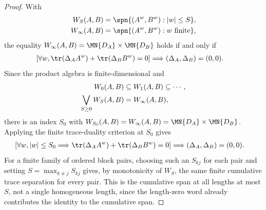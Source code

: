 \begin{proof}
    \leanok
    With
    \begin{align}
        W_S(A,B)
         & =
        \spn\{(A^w,B^w):|w|\le S\},
        \notag \\
        W_\infty(A,B)
         & =
        \spn\{(A^w,B^w):w\text{ finite}\},
        \notag
    \end{align}
    the equality $W_\infty(A,B)=\MN{D_A}\times\MN{D_B}$ holds if and only if
    \begin{align}
        \left[\forall w,
            \tr(\Delta_AA^w)+\tr(\Delta_BB^w)=0\right]
         & \Longrightarrow (\Delta_A,\Delta_B)=(0,0).
        \notag
    \end{align}
    Since the product algebra is finite-dimensional and
    \begin{align}
        W_0(A,B)                & \subseteq W_1(A,B) \subseteq \cdots,
        \notag                                                         \\
        \bigvee_{S\ge0}W_S(A,B) & = W_\infty(A,B),
        \notag
    \end{align}
    there is an index $S_0$ with
    $W_{S_0}(A,B) = W_\infty(A,B) = \MN{D_A}\times\MN{D_B}$.
    Applying the finite trace-duality criterion at $S_0$ gives
    \begin{align}
        \left[\forall w,
            |w|\le S_0
            \Longrightarrow
            \tr(\Delta_AA^w)+\tr(\Delta_BB^w)=0\right]
         & \Longrightarrow
        (\Delta_A,\Delta_B)=(0,0).
        \notag
    \end{align}
    For a finite family of ordered block pairs, choosing such an $S_{kj}$ for
    each pair and setting $S=\max_{k\ne j}S_{kj}$ gives, by monotonicity of
    $W_S$, the same finite cumulative trace separation for every pair.
    This is the cumulative span at all lengths at most $S$, not a single
    homogeneous length, since the length-zero word already contributes the
    identity to the cumulative span.
\end{proof}

